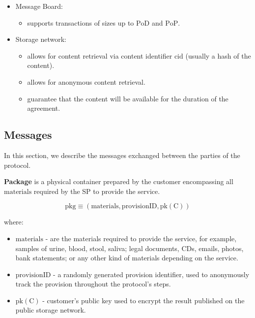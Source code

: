 \begin{itemize}
\item Message Board:
    \begin{itemize}
        \item supports transactions of sizes up to $\mathrm{PoD}$ and $\mathrm{PoP}$.
    \end{itemize}

\item Storage network:
    \begin{itemize}
        \item allows for content retrieval via content identifier $\mathrm{cid}$ (usually a hash of the content).
        \item allows for anonymous content retrieval.
        \item guarantee that the content will be available for the duration of the agreement.
    \end{itemize}
\end{itemize}

\subsection{Messages}\label{messages}
In this section, we describe the messages exchanged between the parties of the protocol.

\vspace{5mm}

\noindent \textbf
{Package}\label{package} is a physical container prepared by the customer encompassing all $\mathrm{materials}$ required by the SP to provide the service.

$$\mathrm{pkg} \equiv (\mathrm{materials}, \mathrm{provisionID}, \mathrm{pk(C)})$$

where:

\begin{itemize}

\item $\mathrm{materials}$ - are the materials required to provide the service, for example, samples of urine, blood, stool, saliva; legal documents, CDs, emails, photos, bank statements; or any other kind of materials depending on the service.
\item $\mathrm{provisionID}$ - a randomly generated provision identifier, used to anonymously track the provision throughout the protocol's steps.
\item $\mathrm{pk(C)}$ - customer's public key used to encrypt the result published on the public storage network.
\end{itemize}

